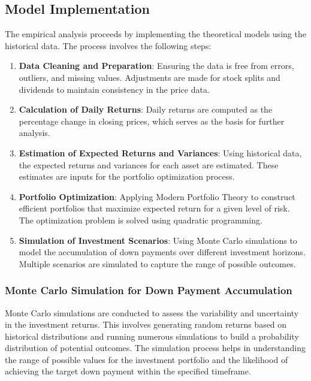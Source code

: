\subsection{Model Implementation}
The empirical analysis proceeds by implementing the theoretical models using the historical data. The process involves the following steps:
\begin{enumerate}
    \item \textbf{Data Cleaning and Preparation}: Ensuring the data is free from errors, outliers, and missing values. Adjustments are made for stock splits and dividends to maintain consistency in the price data.
    \item \textbf{Calculation of Daily Returns}: Daily returns are computed as the percentage change in closing prices, which serves as the basis for further analysis.
    \item \textbf{Estimation of Expected Returns and Variances}: Using historical data, the expected returns and variances for each asset are estimated. These estimates are inputs for the portfolio optimization process.
    \item \textbf{Portfolio Optimization}: Applying Modern Portfolio Theory to construct efficient portfolios that maximize expected return for a given level of risk. The optimization problem is solved using quadratic programming.
    \item \textbf{Simulation of Investment Scenarios}: Using Monte Carlo simulations to model the accumulation of down payments over different investment horizons. Multiple scenarios are simulated to capture the range of possible outcomes.
\end{enumerate}

\subsubsection{Monte Carlo Simulation for Down Payment Accumulation}
Monte Carlo simulations are conducted to assess the variability and uncertainty in the investment returns. This involves generating random returns based on historical distributions and running numerous simulations to build a probability distribution of potential outcomes. The simulation process helps in understanding the range of possible values for the investment portfolio and the likelihood of achieving the target down payment within the specified timeframe.


